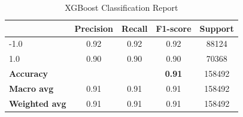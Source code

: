 \documentclass[11pt,letterpaper]{article}
\begin{document}


\begin{table}[H]
\centering
\begin{tabular}{lcccc}
\hline
\textbf{} & \textbf{Precision} & \textbf{Recall} & \textbf{F1-score} & \textbf{Support} \\
\hline
-1.0 & 0.92 & 0.92 & 0.92 & 88124 \\
1.0 & 0.90 & 0.90 & 0.90 & 70368 \\
\hline
\textbf{Accuracy} & & & \textbf{0.91} & 158492 \\
\textbf{Macro avg} & 0.91 & 0.91 & 0.91 & 158492 \\
\textbf{Weighted avg} & 0.91 & 0.91 & 0.91 & 158492 \\
\hline
\end{tabular}
\caption{XGBoost Classification Report}
\label{tab:classification_report3}
\end{table}
\end{document}
